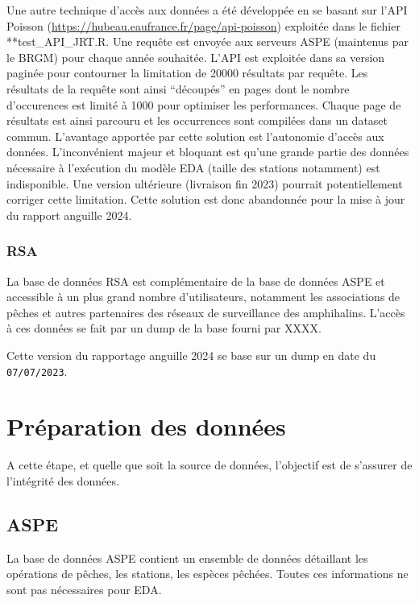 \documentclass[]{template/RapportPole}
\begin{document}
Une autre technique d'accès aux données a été développée en se basant sur l'API Poisson (\url{https://hubeau.eaufrance.fr/page/api-poisson}) exploitée dans le fichier **test\_API\_JRT.R. Une requête est envoyée aux serveurs ASPE (maintenus par le BRGM) pour chaque année souhaitée. L'API est exploitée dans sa version paginée pour contourner la limitation de 20000 résultats par requête. Les résultats de la requête sont ainsi ``découpés'' en pages dont le nombre d'occurences est limité à 1000 pour optimiser les performances. Chaque page de résultats est ainsi parcouru et les occurrences sont compilées dans un dataset commun. L'avantage apportée par cette solution est l'autonomie d'accès aux données. L'inconvénient majeur et bloquant est qu'une grande partie des données nécessaire à l'exécution du modèle EDA (taille des stations notamment) est indisponible. Une version ultérieure (livraison fin 2023) pourrait potentiellement corriger cette limitation. Cette solution est donc abandonnée pour la mise à jour du rapport anguille 2024.

\hypertarget{rsa}{%
\subsection{RSA}\label{rsa}}

La base de données RSA est complémentaire de la base de données ASPE et accessible à un plus grand nombre d'utilisateurs, notamment les associations de pêches et autres partenaires des réseaux de surveillance des amphihalins. L'accès à ces données se fait par un dump de la base fourni par XXXX.

Cette version du rapportage anguille 2024 se base sur un dump en date du \texttt{07/07/2023}.

\hypertarget{pruxe9paration-des-donnuxe9es}{%
\chapter{Préparation des données}\label{pruxe9paration-des-donnuxe9es}}

A cette étape, et quelle que soit la source de données, l'objectif est de s'assurer de l'intégrité des données.

\hypertarget{aspe-1}{%
\section{ASPE}\label{aspe-1}}

La base de données ASPE contient un ensemble de données détaillant les opérations de pêches, les stations, les espèces pêchées. Toutes ces informations ne sont pas nécessaires pour EDA.
\end{document}
